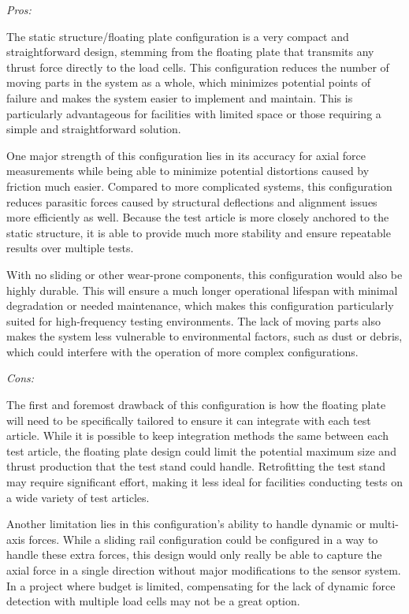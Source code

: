 \noindent\textit{Pros:}

The static structure/floating plate configuration is a very compact and straightforward design, stemming from the floating plate that transmits any thrust force directly to the load cells. This configuration reduces the number of moving parts in the system as a whole, which minimizes potential points of failure and makes the system easier to implement and maintain. This is particularly advantageous for facilities with limited space or those requiring a simple and straightforward solution.

One major strength of this configuration lies in its accuracy for axial force measurements while being able to minimize potential distortions caused by friction much easier. Compared to more complicated systems, this configuration reduces parasitic forces caused by structural deflections and alignment issues more efficiently as well. Because the test article is more closely anchored to the static structure, it is able to provide much more stability and ensure repeatable results over multiple tests.

With no sliding or other wear-prone components, this configuration would also be highly durable. This will ensure a much longer operational lifespan with minimal degradation or needed maintenance, which makes this configuration particularly suited for high-frequency testing environments. The lack of moving parts also makes the system less vulnerable to environmental factors, such as dust or debris, which could interfere with the operation of more complex configurations.

\noindent\textit{Cons:}

The first and foremost drawback of this configuration is how the floating plate will need to be specifically tailored to ensure it can integrate with each test article. While it is possible to keep integration methods the same between each test article, the floating plate design could limit the potential maximum size and thrust production that the test stand could handle. Retrofitting the test stand may require significant effort, making it less ideal for facilities conducting tests on a wide variety of test articles.

Another limitation lies in this configuration’s ability to handle dynamic or multi-axis forces. While a sliding rail configuration could be configured in a way to handle these extra forces, this design would only really be able to capture the axial force in a single direction without major modifications to the sensor system. In a project where budget is limited, compensating for the lack of dynamic force detection with multiple load cells may not be a great option.

